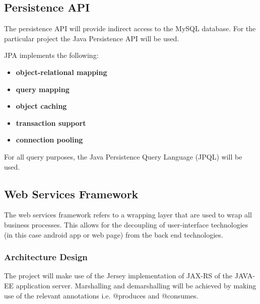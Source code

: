 \documentclass[a4paper,12pt]{article}
\begin{document}
	\subsection{Persistence API}
	The persistence API will provide indirect access to the MySQL database. For the particular project the Java Persistence API will be used.
	
	{\noindent}JPA implements the following:
	\begin{itemize}
		\item\textbf{object-relational mapping}
		\item\textbf{query mapping}
		\item\textbf{object caching}
		\item\textbf{transaction support}
		\item\textbf{connection pooling}
	\end{itemize}
	
	{\noindent}For all query purposes, the Java Persistence Query Language (JPQL) will be used.
	
	\subsection{Web Services Framework}
	The web services framework refers to a wrapping layer that are used to wrap all business processes. This allows for the decoupling of user-interface technologies (in this case android app or web page) from the back end technologies.
	
	\subsubsection{Architecture Design}
	The project will make use of the Jersey implementation of JAX-RS of the JAVA-EE application server. Marshalling and demarshalling will be achieved by making use of the relevant annotations i.e. @produces and @consumes.
\end{document}

